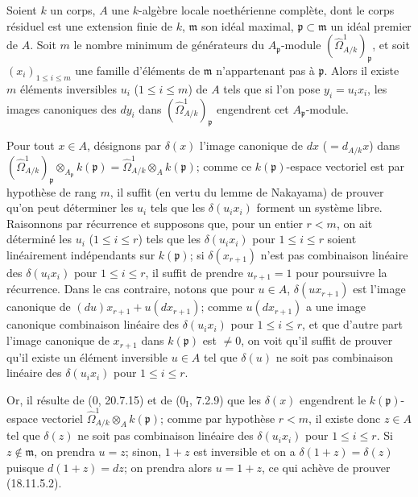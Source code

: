 \begin{lemma}[18.11.5.2]
\label{IV.18.11.5.2}
Soient $k$ un corps, $A$ une $k$-algèbre locale noethérienne complète, dont le corps résiduel est une extension finie de $k$, $\mathfrak m$ son idéal maximal, $\mathfrak p\subset\mathfrak m$ un idéal premier de $A$. Soit $m$ le nombre minimum de générateurs du $A_{\mathfrak p}$-module $(\hat{\Omega}^1_{A/k})_{\mathfrak p}$, et soit $(x_i)_{1\leq i\leq m}$ une famille d'éléments de $\mathfrak m$ n'appartenant pas à $\mathfrak p$. Alors il existe $m$ éléments inversibles $u_i$ ($1\leq i\leq m$) de $A$ tels que si l'on pose $y_i=u_ix_i$, les images canoniques des $dy_i$ dans $(\hat{\Omega}^1_{A/k})_{\mathfrak p}$ engendrent cet $A_{\mathfrak p}$-module.
\end{lemma}

Pour tout $x\in A$, désignons par $\delta(x)$ l'image canonique de $dx$ ($=d_{A/k}x$) dans $(\hat{\Omega}^1_{A/k})_{\mathfrak p}\otimes_{A_{\mathfrak p}}k(\mathfrak p)=\hat{\Omega}^1_{A/k}\otimes_A k(\mathfrak p)$; comme ce $k(\mathfrak p)$-espace vectoriel est par hypothèse de rang $m$, il suffit (en vertu du lemme de Nakayama) de prouver qu'on peut déterminer les $u_i$ tels que les $\delta(u_ix_i)$ forment un système libre. Raisonnons par récurrence et supposons que, pour un entier $r<m$, on ait déterminé les $u_i$ ($1\leq i\leq r$) tels que les $\delta(u_ix_i)$ pour $1\leq i\leq r$ soient linéairement indépendants sur $k(\mathfrak p)$; si $\delta(x_{r+1})$ n'est pas combinaison linéaire des $\delta(u_ix_i)$ pour $1\leq i\leq r$, il suffit de prendre $u_{r+1}=1$ pour poursuivre la récurrence. Dans le cas contraire, notons que pour $u\in A$, $\delta(ux_{r+1})$ est l'image canonique de $(du)x_{r+1}+u(dx_{r+1})$; comme $u(dx_{r+1})$ a une image canonique combinaison linéaire des $\delta(u_ix_i)$ pour $1\leq i\leq r$, et que d'autre part l'image canonique de $x_{r+1}$ dans $k(\mathfrak p)$ est $\neq0$, on voit qu'il suffit de prouver qu'il existe un élément inversible $u\in A$ tel que $\delta(u)$ ne soit pas combinaison linéaire des $\delta(u_ix_i)$ pour $1\leq i\leq r$.


Or, il résulte de (0, 20.7.15) et de ($0_{\mathrm I}$, 7.2.9) que les $\delta(x)$ engendrent le $k(\mathfrak p)$-espace vectoriel $\hat{\Omega}^1_{A/k}\otimes_A k(\mathfrak p)$; comme par hypothèse $r<m$, il existe donc $z\in A$ tel que $\delta(z)$ ne soit pas combinaison linéaire des $\delta(u_ix_i)$ pour $1\leq i\leq r$. Si $z\notin\mathfrak m$, on prendra $u=z$; sinon, $1+z$ est inversible et on a $\delta(1+z)=\delta(z)$ puisque $d(1+z)=dz$; on prendra alors $u=1+z$, ce qui achève de prouver (18.11.5.2).

